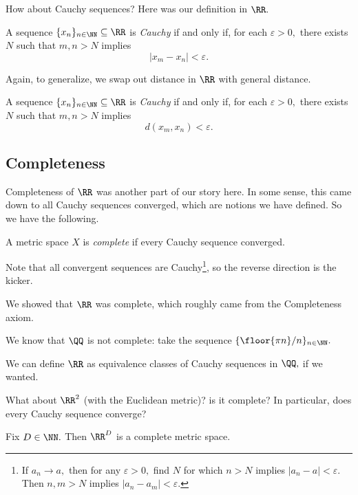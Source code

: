 How about Cauchy sequences? Here was our definition in $\RR.$
\begin{definition}
    A sequence $\{x_n\}_{n\in\NN}\subseteq\RR$ is \textit{Cauchy} if and only if, for each $\varepsilon>0,$ there exists $N$ such that $m,n>N$ implies
    \[|x_m-x_n|<\varepsilon.\]
\end{definition}
Again, to generalize, we swap out distance in $\RR$ with general distance.
\begin{definition}
    A sequence $\{x_n\}_{n\in\NN}\subseteq\RR$ is \textit{Cauchy} if and only if, for each $\varepsilon>0,$ there exists $N$ such that $m,n>N$ implies
    \[d(x_m,x_n)<\varepsilon.\]
\end{definition}

\subsection{Completeness}
Completeness of $\RR$ was another part of our story here. In some sense, this came down to all Cauchy sequences converged, which are notions we have defined. So we have the following.
\begin{definition}[Complete]
    A metric space $X$ is \textit{complete} if every Cauchy sequence converged.
\end{definition}
Note that all convergent sequences are Cauchy\footnote{If $a_n\to a,$ then for any $\varepsilon>0,$ find $N$ for which $n>N$ implies $|a_n-a|<\varepsilon.$ Then $n,m>N$ implies $|a_n-a_m|<\varepsilon.$}, so the reverse direction is the kicker.
\begin{example}
    We showed that $\RR$ was complete, which roughly came from the Completeness axiom.
\end{example}
\begin{nex}
    We know that $\QQ$ is not complete: take the sequence $\{\floor{\pi n}/n\}_{n\in\NN}.$
\end{nex}
\begin{remark}
    We can define $\RR$ as equivalence classes of Cauchy sequences in $\QQ,$ if we wanted.
\end{remark}
What about $\RR^2$ (with the Euclidean metric)? is it complete? In particular, does every Cauchy sequence converge?
\begin{proposition}
    Fix $D\in\NN.$ Then $\RR^D$ is a complete metric space.
\end{proposition}
